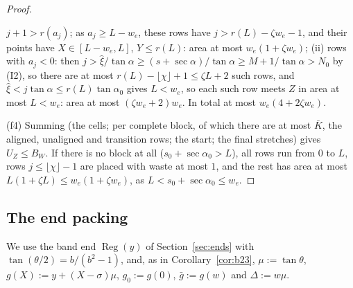 \documentclass[11pt]{amsart}
\newcommand{\Reg}{\operatorname{Reg}}
\newcommand{\ta}{\tan\alpha}
\newcommand{\se}{\sec\alpha}
\newcommand{\taz}{\tan\alpha_0}
\newcommand{\sez}{\sec\alpha_0}
\newcommand{\Kb}{\bar K}
\theoremstyle{definition}
\theoremstyle{remark}
\numberwithin{equation}{section}
\begin{document}
\begin{proof}
\begin{itemize}
$j+1>r(a_j)$; as $a_j\ge L-w_e$, these rows have $j>r(L)-\zeta w_e-1$, and their points have $X\in[L-w_e,L]$,
$Y\le r(L)$: area at most $w_e(1+\zeta w_e)$; (ii) rows with $a_j<0$: then $j>\hat\xi/\ta\ge(s+\se)/\ta\ge M+1/\ta>N_0$
by (I2), so there are at most $r(L)-\lfloor\chi\rfloor+1\le\zeta L+2$ such rows, and $\hat\xi<j\ta\le r(L)\taz$ gives
$L<w_e$, so each such row meets $Z$ in area at most $L<w_e$: area at most $(\zeta w_e+2)w_e$. In total at most
$w_e(4+2\zeta w_e)$.
\end{itemize}
(f4) Summing (the cells; per complete block, of which there are at most $\Kb$, the aligned, unaligned and transition
rows; the start; the final stretches) gives $U_Z\le B_W$. If there is no block at all ($s_0+\sez>L$), all rows run from
$0$ to $L$, rows $j\le\lfloor\chi\rfloor-1$ are placed with waste at most $1$, and the rest has area at most
$L(1+\zeta L)\le w_e(1+\zeta w_e)$, as $L<s_0+\sez\le w_e$.
\end{proof}

\subsection{The end packing}\label{ssec:E38}
We use the band end $\Reg(y)$ of Section~\ref{sec:ends} with $\tan(\theta/2)=b/(b^2-1)$, and, as in
Corollary~\ref{cor:b23}, $\mu:=\tan\theta$, $g(X):=y+(X-\sigma)\mu$, $g_0:=g(0)$, $\bar g:=g(w)$ and $\Delta:=w\mu$.
\end{document}
